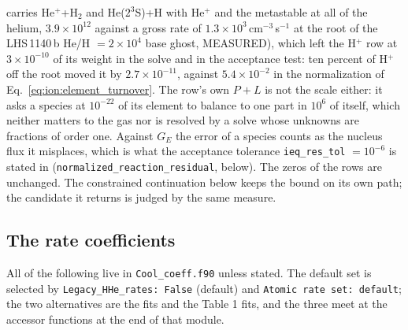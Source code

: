 carries He$^+$+H$_2$ and He($2^3$S)+H with He$^+$ and the metastable at all of
the helium, $3.9\times10^{12}$ against a gross rate of
$1.3\times10^{3}$\,cm$^{-3}$\,s$^{-1}$ at the root of the LHS\,1140\,b He/H
$=2\times10^4$ base ghost, MEASURED), which left the H$^+$ row at
$3\times10^{-10}$ of its weight in the solve and in the acceptance test: ten
percent of H$^+$ off the root moved it by $2.7\times10^{-11}$, against
$5.4\times10^{-2}$ in the normalization of Eq.~\eqref{eq:ion:element_turnover}. The row's own $P+L$ is not the scale
either: it asks a species at $10^{-22}$ of its element to balance to one part
in $10^6$ of itself, which neither matters to the gas nor is resolved by a
solve whose unknowns are fractions of order one. Against $G_E$ the error of a
species counts as the nucleus flux it misplaces, which is what the
acceptance tolerance \texttt{ieq\_res\_tol} $=10^{-6}$ is stated in
(\texttt{normalized\_reaction\_residual}, below). The zeros of the rows are
unchanged. The constrained continuation below keeps the bound on its own
path; the candidate it returns is judged by the same measure.

\subsection{The rate coefficients}
\label{sec:ionization:rates}

All of the following live in \texttt{Cool\_coeff.f90} unless stated. The
default set is selected by \texttt{Legacy\_HHe\_rates: False} (default) and
\texttt{Atomic rate set: default}; the two alternatives are the
\citet{Hui1997} fits and the \citet{Koskinen2022} Table 1 fits, and the
three meet at the accessor functions at the end of that module.

